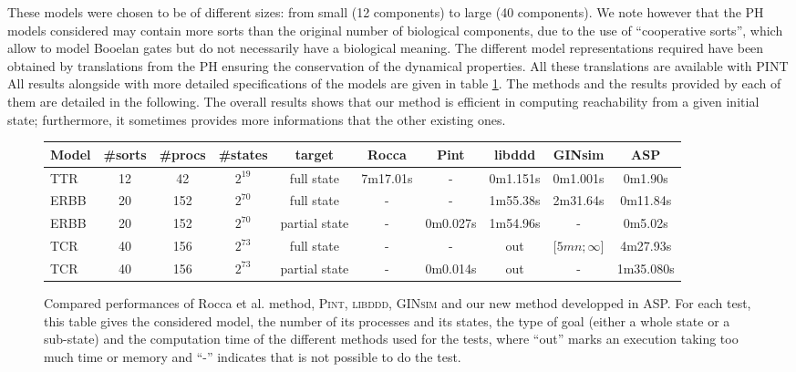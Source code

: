 These models were chosen to be of different sizes:
from small (12 components) to large (40 components).
We note however that the PH models considered may contain more sorts than
the original number of biological components, due to the use of
“cooperative sorts”, which allow to model Booelan gates but do not necessarily
have a biological meaning.
The different model representations required have been obtained by translations
from the PH
ensuring the conservation of the dynamical properties.
All these translations are available with \textsc{PINT} 
All results alongside with more detailed specifications of the models
are given in table \ref{tab:reachability}.
The methods and the results provided by each of them are detailed in the following.
The overall results shows that our method is efficient in computing reachability
from a given initial state;
furthermore, it sometimes provides more informations that the other existing ones.

\begin{figure}[htp]
\begin{center}
\label{tab:reachability}
\noindent%
\begin{tabular}{|l|c|c|c|c||c|c|c|c|c|}
  \hline
   Model&  \#sorts &\#procs & \#states & target & Rocca & Pint & libddd & GINsim & ASP \\
  \hline
  TTR & 12 &42 & $2^{19}$ & full state & 7m17.01s & - & 0m1.151s &  0m1.001s & 0m1.90s \\
  \hline
  ERBB & 20 &152 & $2^{70}$ & full state & - & - &1m55.38s & 2m31.64s & 0m11.84s \\
  \hline
  ERBB & 20 &152 & $2^{70}$ & partial state & - & 0m0.027s &1m54.96s & - & 0m5.02s \\
  \hline
  TCR & 40 &156 & $2^{73}$ & full state & - & - & out & $ \lbrack 5mn ; \infty \rbrack$ & 4m27.93s \\
  \hline
   TCR & 40 &156 & $2^{73}$ & partial state & - & 0m0.014s & out & - & 1m35.080s \\
  \hline
\end{tabular}
\caption{Compared performances of Rocca et al. method, \textsc{Pint}, \textsc{libddd}, \textsc{GINsim} and our new method developped in ASP.
For each test, this table gives the considered model,
the number of its processes and its states, the type of goal
(either a whole state or a sub-state)
and the computation time of the different methods used for the tests,
where “out” marks an execution taking too much time or memory
and “-” indicates that is not possible to do the test.
}
\end{center}
\end{figure}

